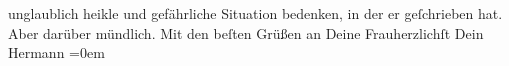 \begin{ledgroupsized}[t]{13cm}
               unglaublich heikle und gefährliche Situation bedenken, in der er geſchrieben hat.
               Aber darüber mündlich.\pend
           \pstart
           Mit den beſten Grüßen an Deine Frauherzlichſt Dein{\\[\baselineskip]}\spacefill\mbox{Hermann}\pend
           \leftskip=0em{}\endnumbering{}\end{ledgroupsized}  \newcommand{\dateiname}{L01337}\newcommand{\titel}{Hermann Bahr an Arthur Schnitzler, 9. 11. 1903}\newcommand{\editorInnen}{ Kurt Ifkovits,  Martin Anton Müller}
      